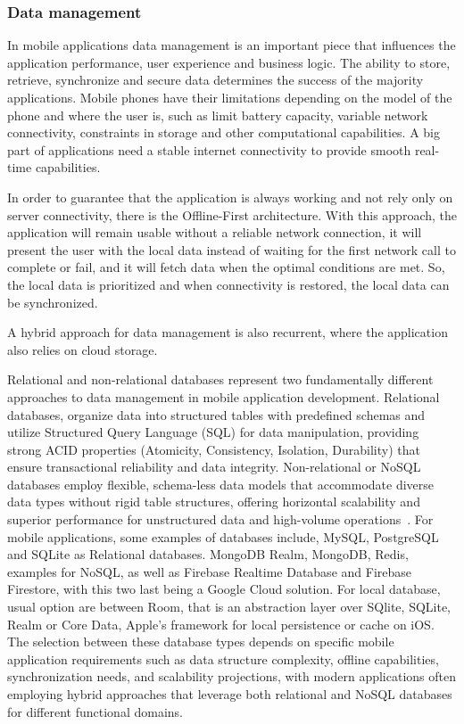 \subsubsection{Data management}

In mobile applications data management is an important piece that influences the application performance, user experience and business logic.
The ability to store, retrieve, synchronize and secure data determines the success of the majority applications.
Mobile phones have their limitations depending on the model of the phone and where the user is, such as limit battery capacity, variable network connectivity, constraints in storage and other computational capabilities.
A big part of applications need a stable internet connectivity to provide smooth real-time capabilities\cite{offlineFirst1}.

In order to guarantee that the application is always working and not rely only on server connectivity, there is the Offline-First architecture.
With this approach, the application will remain usable without a reliable network connection, it will present the user with the local data instead of waiting for the first network call to complete or fail, and it will fetch data when the optimal conditions are met.
So, the local data is prioritized and when connectivity is restored, the local data can be synchronized\cite{offlineFirst1}.

A hybrid approach for data management is also recurrent, where the application also relies on cloud storage.

Relational and non-relational databases represent two fundamentally different approaches to data management in mobile application development.
Relational databases, organize data into structured tables with predefined schemas and utilize Structured Query Language (SQL) for data manipulation, providing strong ACID properties (Atomicity, Consistency, Isolation, Durability) that ensure transactional reliability and data integrity\cite{chiriac2025nosql}.
Non-relational or NoSQL databases employ flexible, schema-less data models that accommodate diverse data types without rigid table structures, offering horizontal scalability and superior performance for unstructured data and high-volume operations~\cite{chiriac2025nosql}.
For mobile applications, some examples of databases include, MySQL\cite{mysql}, PostgreSQL\cite{postgresql} and SQLite\cite{SQLite} as Relational databases.
MongoDB Realm\cite{realm}, MongoDB\cite{mongo}, Redis\cite{redis}, examples for NoSQL, as well as Firebase Realtime Database\cite{firebaseRealtime2025} and Firebase Firestore\cite{firestore2025}, with this two last being a Google Cloud solution.
For local database, usual option are between Room\cite{room}, that is an abstraction layer over SQlite, SQLite, Realm or Core Data, Apple's framework for local persistence or cache on iOS\cite{coreData}.
The selection between these database types depends on specific mobile application requirements such as data structure complexity, offline capabilities, synchronization needs, and scalability projections, with modern applications often employing hybrid approaches that leverage both relational and NoSQL databases for different functional domains\cite{Taipalus2024}.


